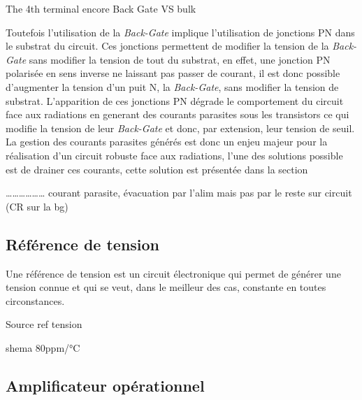 \begin{metsUneSource}
The 4th terminal encore Back Gate VS bulk
\end{metsUneSource}

Toutefois l’utilisation de la \textit{Back-Gate} implique l’utilisation de jonctions PN dans le substrat du circuit. Ces jonctions permettent de modifier la tension de la \textit{Back-Gate} sans modifier la tension de tout du substrat, en effet, une jonction PN polarisée en sens inverse ne laissant pas passer de courant, il est donc possible d’augmenter la tension d’un puit N, la \textit{Back-Gate}, sans modifier la tension de substrat.
L’apparition de ces jonctions PN dégrade le comportement du circuit face aux radiations en generant des courants parasites sous les transistors ce qui modifie la tension de leur \textit{Back-Gate} et donc, par extension, leur tension de seuil. La gestion des courants parasites générés est donc un enjeu majeur pour la réalisation d’un circuit robuste face aux radiations, l'une des solutions possible est de drainer ces courants, cette solution est présentée dans la section %

\begin{metsUneSource}
……………… courant parasite, évacuation par l’alim mais pas par le reste sur circuit (CR sur la bg)
\end{metsUneSource}




\subsection{Référence de tension}

Une référence de tension est un circuit électronique qui permet de générer une tension connue et qui se veut, dans le meilleur des cas, constante en toutes circonstances. 

\begin{metsUneSource}
Source ref tension


shema 80ppm/°C
\end{metsUneSource}



\subsection{Amplificateur opérationnel}




